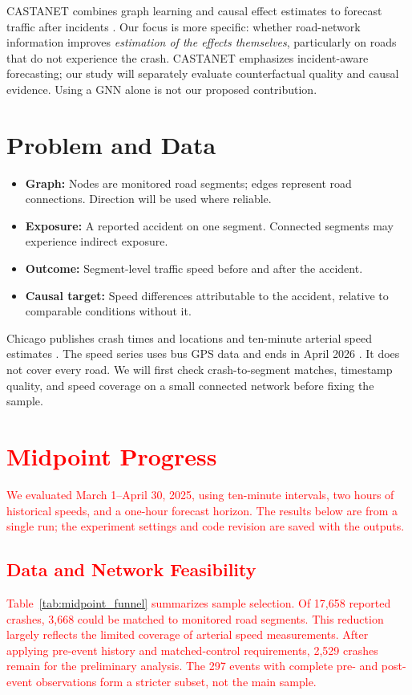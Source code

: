 \documentclass[sigconf,nonacm]{acmart}
\begin{document}
CASTANET combines graph learning and causal effect estimates to
forecast traffic after incidents \cite{kitahara2026castanet}.
Our focus is more specific: whether road-network information improves
\emph{estimation of the effects themselves}, particularly on roads
that do not experience the crash. CASTANET emphasizes incident-aware
forecasting; our study will separately evaluate counterfactual quality
and causal evidence. Using a GNN alone is not our proposed contribution.

\section{Problem and Data}
\begin{itemize}
    \item \textbf{Graph:} Nodes are monitored road segments; edges
    represent road connections. Direction will be used where reliable.
    \item \textbf{Exposure:} A reported accident on one segment.
    Connected segments may experience indirect exposure.
    \item \textbf{Outcome:} Segment-level traffic speed before and
    after the accident.
    \item \textbf{Causal target:} Speed differences attributable to
    the accident, relative to comparable conditions without it.
\end{itemize}

Chicago publishes crash times and locations and ten-minute arterial
speed estimates \cite{chicagoCrashes,chicagoSpeeds}. The speed series
uses bus GPS data and ends in April 2026
\cite{chicagoTrackerNotice}. It does not cover every road. We will
first check crash-to-segment matches, timestamp quality, and speed
coverage on a small connected network before fixing the sample.


\section{\textcolor{red}{Midpoint Progress}}
\textcolor{red}{We evaluated March 1--April 30, 2025, using ten-minute
intervals, two hours of historical speeds, and a one-hour forecast
horizon. The results below are from a single run; the
experiment settings and code revision are saved with the outputs.}

\subsection{\textcolor{red}{Data and Network Feasibility}}
\textcolor{red}{Table~\ref{tab:midpoint_funnel} summarizes sample
selection. Of 17{,}658 reported crashes, 3{,}668 could be matched to
monitored road segments. This reduction largely reflects the limited
coverage of arterial speed measurements. After applying pre-event
history and matched-control requirements, 2{,}529 crashes remain for
the preliminary analysis. The 297 events with complete pre- and
post-event observations form a stricter subset, not the main sample.}
\end{document}
